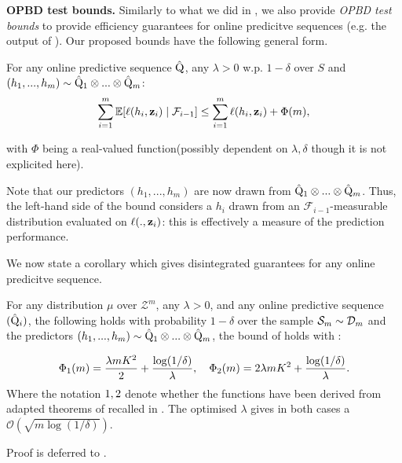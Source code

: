 \textbf{OPBD test bounds.}
Similarly to what we did in , we also provide \emph{OPBD test bounds} to provide efficiency guarantees for online predicitve sequences (e.g. the output of ). Our proposed bounds have the following general form.

For any online predictive sequence $\hat{\mathrm{Q}}$, any $\lambda>0$ w.p. $1-\delta$ over $S$ and $(h_1,...,h_{m})\sim \hat{\mathrm{Q}}_1\otimes...\otimes \hat{\mathrm{Q}}_{m}$:
\begin{align}
  \label{eq: OPBD_test_bound}
  \sum_{i=1}^m  \mathbb{E}[\ell(h_i,\mathbf{z}_i) \mid \mathcal{F}_{i-1}]   \leq \sum_{i=1}^m  \ell(h_i,\mathbf{z}_i)   + \Phi(m),
\end{align}

with $\Phi$ being a real-valued function(possibly dependent on $\lambda,\delta$ though it is not explicited here).

Note that our predictors $(h_1,...,h_m)$ are now drawn from $\hat{\mathrm{Q}}_1\otimes...\otimes \hat{\mathrm{Q}}_{m}$. Thus, the left-hand side of the bound considers a $h_i$ drawn from an $\mathcal{F}_{i-1}$-measurable distribution evaluated on $\ell(.,\mathbf{z}_i)$: this is effectively a measure of the prediction performance.

We now state a corollary which gives disintegrated guarantees for any online predicitve sequence.

\begin{corollary}
  \label{cor: OPBD_test_bound}
  For any distribution $\mu$ over $\mathcal{Z}^m$, any $\lambda>0$, and any online predictive sequence $(\hat{\mathrm{Q}}_i)$, the following holds with probability $1-\delta$ over the sample $\mathcal{S}_m\sim\mathcal{D}_{m}$ and the predictors $(h_1,...,h_m)\sim \hat{\mathrm{Q}}_1\otimes...\otimes \hat{\mathrm{Q}}_m$, the bound of  holds with  :

  \begin{align*}
    \Phi_{\normalfont1}(m)= \frac{\lambda m K^2}{2} + \frac{\log(1/\delta)}{\lambda}, \quad \Phi_{\normalfont2}(m) = 2\lambda m K^2 + \frac{\log(1/\delta)}{\lambda}.
  \end{align*}
  Where the notation $\normalfont1, \normalfont2$ denote whether the functions have been derived from adapted theorems of \citealp{rivasplata2020pac,viallard2023general} recalled in . The optimised $\lambda$ gives in both cases a $\mathcal{O}(\sqrt{m\log(1/\delta)})$.
\end{corollary}

 Proof is deferred to .

